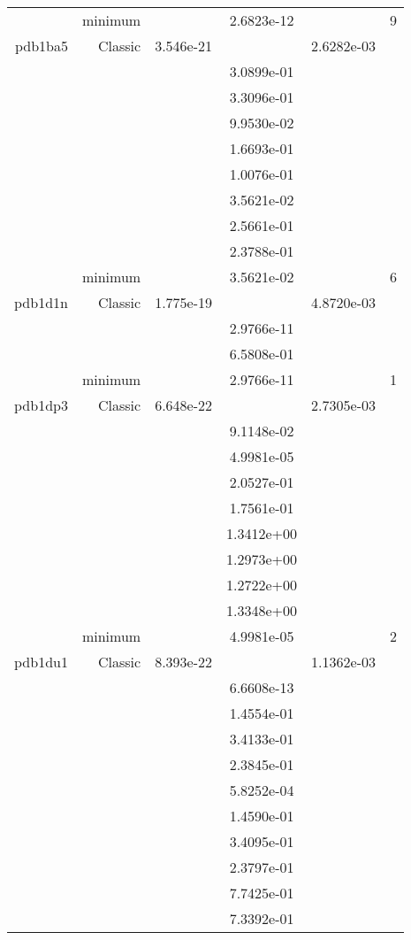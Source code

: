\begin{xltabular}{\textwidth}{r|rS[table-format=1.3e+2]S[table-format=1.4e+2]S[table-format=1.4e+2]S[table-format=-1.5]}
& minimum &  & 2.6823e-12 & & 9 \\  \addlinespace
pdb1ba5 & Classic & 3.546e-21 &  & 2.6282e-03 & \\
&  &  & 3.0899e-01 & & \\
&  &  & 3.3096e-01 & & \\
&  &  & 9.9530e-02 & & \\
&  &  & 1.6693e-01 & & \\
&  &  & 1.0076e-01 & & \\
&  &  & 3.5621e-02 & & \\
&  &  & 2.5661e-01 & & \\
&  &  & 2.3788e-01 & & \\
& minimum &  & 3.5621e-02 & & 6 \\  \addlinespace
pdb1d1n & Classic & 1.775e-19 &  & 4.8720e-03 & \\
&  &  & 2.9766e-11 & & \\
&  &  & 6.5808e-01 & & \\
& minimum &  & 2.9766e-11 & & 1 \\  \addlinespace
pdb1dp3 & Classic & 6.648e-22 &  & 2.7305e-03 & \\
&  &  & 9.1148e-02 & & \\
&  &  & 4.9981e-05 & & \\
&  &  & 2.0527e-01 & & \\
&  &  & 1.7561e-01 & & \\
&  &  & 1.3412e+00 & & \\
&  &  & 1.2973e+00 & & \\
&  &  & 1.2722e+00 & & \\
&  &  & 1.3348e+00 & & \\
& minimum &  & 4.9981e-05 & & 2 \\  \addlinespace
pdb1du1 & Classic & 8.393e-22 &  & 1.1362e-03 & \\
&  &  & 6.6608e-13 & & \\
&  &  & 1.4554e-01 & & \\
&  &  & 3.4133e-01 & & \\
&  &  & 2.3845e-01 & & \\
&  &  & 5.8252e-04 & & \\
&  &  & 1.4590e-01 & & \\
&  &  & 3.4095e-01 & & \\
&  &  & 2.3797e-01 & & \\
&  &  & 7.7425e-01 & & \\
&  &  & 7.3392e-01 & & \\

\end{xltabular}
